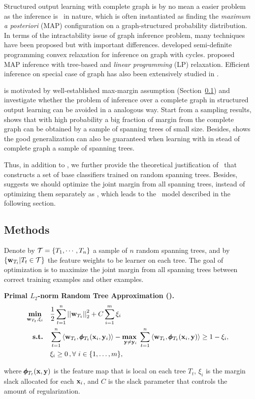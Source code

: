 {Structured output learning with complete graph is by no mean a easier problem as the inference is \nphard\ in nature, which is often instantiated as finding the \textit{maximum a posteriori} (MAP) configuration on a graph-structured probability distribution.
In terms of the intractability issue of graph inference problem, many techniques have been proposed but with important differences.
\citet{Jordan04semiefinite} developed semi-definite programming convex relaxation for inference on graph with cycles.
\citet{Wainwright05map} proposed MAP inference with tree-based and \textit{linear programming} (LP) relaxation.
Efficient inference on special case of graph has also been extensively studied in \citep{Globerson07approximate}.

 is motivated by well-established max-margin assumption (Section~\ref{}) and investigate whether the problem of inference over a complete graph in structured output learning can be avoided in a analogous way.
Start from a sampling results,  shows that with high probability a big fraction of margin from the complete graph can be obtained by a sample of spanning trees of small size.
Besides,  shows the good generalization can also be guaranteed when learning with in stead of complete graph a sample of spanning trees.

Thus, in addition to , we further provide the theoretical justification of \mam\ that constructs a set of base classifiers trained on random spanning trees. 
Besides,  suggests we should optimize the joint margin from all spanning trees, instead of optimizing them separately as \mam, which leads to the \rta\ model described in the following section.

\subsection{Methods}

Denote by $\mathcal{T}=\{T_1,\cdots,T_n\}$ a sample of $n$ random spanning trees, and by $\{\mathbf {w}_{T_t}|T_t\in\mathcal{T}\}$ the feature weights to be learner on each tree.
The goal of optimization is to maximize the joint margin from all spanning trees between correct training examples and other examples.
\begin{definition}{\bf Primal $L_2$-norm Random Tree Approximation (\rta).}\label{primalrta}
	\begin{align*}
		\underset{\vw_{T_t},\xi_i}{\minimize} & \quad \frac{1}{2}\sum_{t=1}^{n}\norm{\vw_{T_t}}_2^2 + C\sum_{i=1}^{m}\xi_i\\
		\st & \quad \sum_{t=1}^{n}{ \langle \vw_{T_t}, \phib_{T_t}(\vx_i,\vy_i) \rangle} - \underset{\vy \neq \vy_i}{\maximize\ } \sum_{t=1}^{n}{\langle \vw_{T_t}, \phib_{T_t}(\vx_i,\vy) \rangle } \geq 1 -  \xi_i, \\
		& \quad \xi_i\ge0\, , \forall\ i \in \set{1,\dots,m},
	\end{align*}
\end{definition}
where $\pmb \phi_{T_t}(\mathbf {x},\mathbf {y})$ is the feature map that is local on each tree $T_t$, $\xi_i$ is the margin slack allocated for each $\mathbf {x}_i$, and $C$ is the slack parameter that controls the amount of regularization.

}
